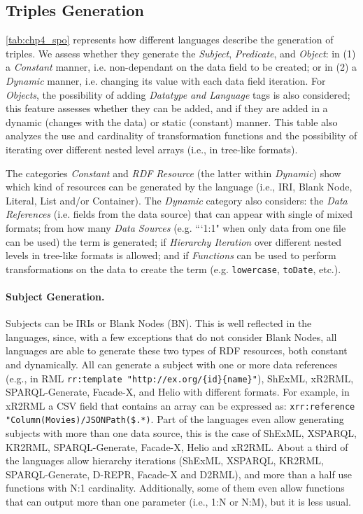 \subsection{Triples Generation}
\cref{tab:chp4_spo} represents how different languages describe the generation of triples. We assess whether they generate the \textit{Subject}, \textit{Predicate}, and \textit{Object}: in (1) a \textit{Constant} manner, i.e. non-dependant on the data field to be created; or in (2) a \textit{Dynamic} manner, i.e. changing its value with each data field iteration. For \textit{Objects}, the possibility of adding \textit{Datatype and Language} tags is also considered; this feature assesses whether they can be added, and if they are added in a dynamic (changes with the data) or static (constant) manner. This table also analyzes the use and cardinality of transformation functions and the possibility of iterating over different nested level arrays (i.e., in tree-like formats).

The categories \textit{Constant} and \textit{RDF Resource} (the latter within \textit{Dynamic}) show which kind of resources can be generated by the language (i.e., IRI, Blank Node, Literal, List and/or Container). The \textit{Dynamic} category also considers: the \textit{Data References} (i.e. fields from the data source) that can appear with single of mixed formats; from how many \textit{Data Sources} (e.g. ```1:1" when only data from one file can be used) the term is generated; if \textit{Hierarchy Iteration} over different nested levels in tree-like formats is allowed; and if \textit{Functions} can be used to perform transformations on the data to create the term (e.g. \texttt{lowercase}, \texttt{toDate}, etc.).

\noindent\paragraph{\textbf{Subject Generation.}} Subjects can be IRIs or Blank Nodes (BN). This is well reflected in the languages, since, with a few exceptions that do not consider Blank Nodes, all languages are able to generate these two types of RDF resources, both constant and dynamically. All can generate a subject with one or more data references (e.g., in RML \texttt{rr:template "http://ex.org/\{id\}\-\{name\}"}), ShExML, xR2R\-ML, SPARQL-Generate, Facade-X, and Helio with different formats. For example, in xR2RML a CSV field that contains an array can be expressed as: \texttt{xrr:reference "Column(Mo\-vies)/JSONPath(\$.*)}. Part of the languages even allow generating subjects with more than one data source, this is the case of ShExML, XSPARQL, KR2RML, SPARQL-Generate, Facade-X, Helio and xR2RML. About a third of the languages allow hierarchy iterations (ShExML, XSPARQL, KR2RML, SPARQL-Generate, D-REPR, Facade-X and D2RML), and more than a half use functions with N:1 cardinality. Additionally, some of them even allow functions that can output more than one parameter (i.e., 1:N or N:M), but it is less usual.



